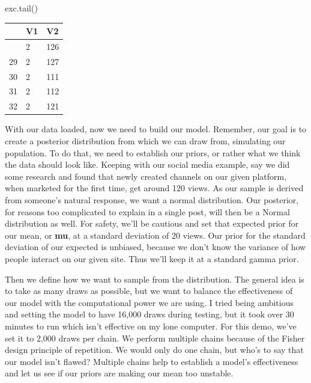 \documentclass[
  letterpaper,
  DIV=11,
  numbers=noendperiod]{scrartcl}
\newenvironment{Shaded}{\begin{snugshade}}{\end{snugshade}}
\newcommand{\NormalTok}[1]{\textcolor[rgb]{0.00,0.23,0.31}{#1}}
\newcounter{none} %
\begin{document}
\begin{Shaded}
\begin{Highlighting}[]
\NormalTok{exc.tail()}
\end{Highlighting}
\end{Shaded}

{\def\LTcaptype{none} %
\begin{longtable}[]{@{}lll@{}}
\toprule\noalign{}
& V1 & V2 \\
\midrule\noalign{}
\endhead
\bottomrule\noalign{}
\endlastfoot
28 & 2 & 126 \\
29 & 2 & 127 \\
30 & 2 & 111 \\
31 & 2 & 112 \\
32 & 2 & 121 \\
\end{longtable}
}

With our data loaded, now we need to build our model. Remember, our goal
is to create a posterior distribution from which we can draw from,
simulating our population. To do that, we need to establish our priors,
or rather what we think the data should look like. Keeping with our
social media example, say we did some research and found that newly
created channels on our given platform, when marketed for the first
time, get around 120 views. As our sample is derived from someone's
natural response, we want a normal distribution. Our posterior, for
reasons too complicated to explain in a single post, will then be a
Normal distribution as well. For safety, we'll be cautious and set that
expected prior for our mean, or \textbf{mu}, at a standard deviation of
20 views. Our prior for the standard deviation of our expected is
unbiased, because we don't know the variance of how people interact on
our given site. Thus we'll keep it at a standard gamma prior.

Then we define how we want to sample from the distribution. The general
idea is to take as many draws as possible, but we want to balance the
effectiveness of our model with the computational power we are using. I
tried being ambitious and setting the model to have 16,000 draws during
testing, but it took over 30 minutes to run which isn't effective on my
lone computer. For this demo, we've set it to 2,000 draws per chain. We
perform multiple chains because of the Fisher design principle of
repetition. We would only do one chain, but who's to say that our model
isn't flawed? Multiple chains help to establish a model's effectiveness
and let us see if our priors are making our mean too unstable.
\end{document}
